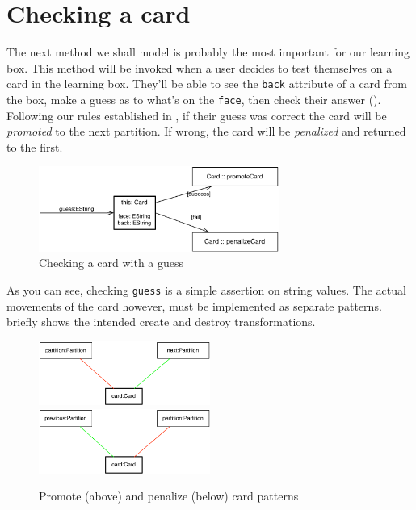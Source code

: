 \newpage
\hypertarget{sec:checkCard}{}
\chapter{Checking a card}
\genHeader

The next method we shall model is probably the most important for our learning box. This method will be invoked when a user decides to test themselves on a card
in the learning box. They'll be able to see the \texttt{back} attribute of a card from the box, make a guess as to what's on the \texttt{face}, then 
check their answer (). Following our rules established in , if their guess was correct the card will be
\emph{promoted} to the next partition. If wrong, the card will be \emph{penalized} and returned to the first.

\begin{figure}[htbp]
 	\centering
   \includegraphics[width=0.7\textwidth]{../../org.moflon.doc.handbook.03_storyDiagrams/04_checkCard/splashImages/goal_checkCard.pdf}
 	\caption{Checking a card with a guess}
 	\label{fig:goal_check}
\end{figure}
\FloatBarrier

As you can see, checking \texttt{guess} is a simple assertion on string values. The actual movements of the card however, must be implemented as separate
patterns.  briefly shows the intended create and destroy transformations.

\begin{figure}[htbp]
 	\centering
   \includegraphics[width=0.5\textwidth]{../../org.moflon.doc.handbook.03_storyDiagrams/04_checkCard/splashImages/checkCard_promote.pdf}
   \\ \vspace{1cm}
    \includegraphics[width=0.5\textwidth]{../../org.moflon.doc.handbook.03_storyDiagrams/04_checkCard/splashImages/checkCard_penalize.pdf}
 	\caption{Promote (above) and penalize (below) card patterns}
 	\label{fig:patterns_check}
\end{figure}
\FloatBarrier

